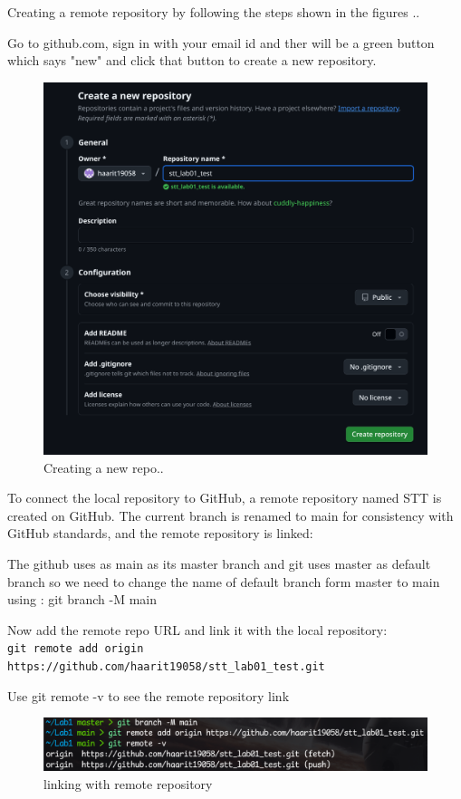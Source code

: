 \documentclass[a4paper,12pt,twoside,english]{all-in-one} %
\begin{document}
Creating a remote repository by following the steps shown in the figures ..

Go to github.com, sign in with your email id and ther will be a green button which says "new" and click that button to create a new repository.

\begin{figure}[H]
    \centering
    \includegraphics[width=0.75\linewidth]{image08.png}
    \caption{Creating a new repo..}
    \label{fig:placeholder}
\end{figure}



To connect the local repository to GitHub, a remote repository named STT is created on GitHub. The current branch is renamed to main for consistency with GitHub standards, and the remote repository is linked:

The github uses as main as its master branch and git uses master as default branch so we need to change the name of default branch form master to main using : git branch -M main

Now add the remote repo URL and link it with the local repository: \\
\texttt{git remote add origin https://github.com/haarit19058/stt\_lab01\_test.git}


Use git remote -v to see the remote repository link


\begin{figure}[H]
    \centering
    \includegraphics[width=0.75\linewidth]{image09.png}
    \caption{linking with remote repository}
    \label{fig:placeholder}
\end{figure}
\end{document}
